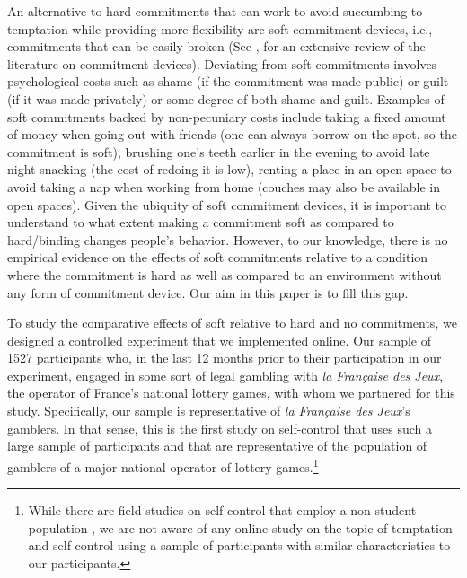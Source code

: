 \documentclass[
]{book}
\begin{document}
An alternative to hard commitments that can work to avoid succumbing to
temptation while providing more flexibility are soft commitment devices, i.e.,
commitments that can be easily broken (See \citet{bryan2010commitment}, for an
extensive review of the literature on commitment devices).
Deviating from soft commitments involves psychological costs such as shame (if
the commitment was made public) or guilt (if it was made privately) or some
degree of both shame and guilt.
Examples of soft commitments backed by non-pecuniary costs include taking a
fixed amount of money when going out with friends (one can always borrow on the
spot, so the commitment is soft), brushing one's teeth earlier in the evening to
avoid late night snacking (the cost of redoing it is low), renting a place in an
open space to avoid taking a nap when working from home (couches may also be
available in open spaces).
Given the ubiquity of soft commitment devices, it is important to understand to
what extent making a commitment soft as compared to hard/binding changes
people's behavior.
However, to our knowledge, there is no empirical evidence on the effects of
soft commitments relative to a condition where the commitment is hard as well as
compared to an environment without any form of commitment device.
Our aim in this paper is to fill this gap.

To study the comparative effects of soft relative to hard and no commitments, we
designed a controlled experiment that we implemented online.
Our sample of 1527 participants who, in the last 12 months prior to their
participation in our experiment, engaged in some sort of legal gambling with
\emph{la Française des Jeux}, the operator of France's national lottery games, with
whom we partnered for this study.
Specifically, our sample is representative of \emph{la Française des Jeux}'s gamblers.
In that sense, this is the first study on self-control that uses such a large
sample of participants and that are representative of the population of gamblers
of a major national operator of lottery games.\footnote{While there are field studies on self control that employ a non-student
  population \citep{ashraf2006tying, milkman2014holding} ,
  we are not aware of any online study on the topic of temptation and self-control
  using a sample of participants with similar characteristics to our participants.}
\end{document}
